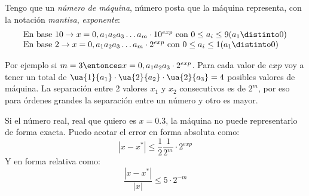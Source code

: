Tengo que un \textit{número de máquina}, número posta que la máquina representa, con la notación \textit{mantisa}, \textit{exponente}:
$$
  \begin{array}{l}
    \text{En base 10} \to x = 0,a_1a_2a_3 \ldots a_m \cdot 10^{exp}  \text{ con } 0 \leq a_i \leq 9 (a_1 \distinto 0) \\
    \text{En base 2} \to x = 0,a_1a_2a_3 \ldots a_m \cdot 2^{exp}  \text{ con } 0 \leq a_i \leq 1  (a_1 \distinto 0)
  \end{array}
$$

Por ejemplo si $m = 3 \entonces x = 0,a_1a_2a_3 \cdot 2^{exp}$.
Para cada valor de $exp$ voy a tener un total de $\ua{1}{a_1} \cdot \ua{2}{a_2} \cdot \ua{2}{a_3} = 4$ posibles valores de máquina.
La separación entre 2 valores $x_1$ y $x_2$ consecutivos es de $2^m$, por eso para órdenes grandes la separación entre un número y otro
es mayor.

Si el número real, real que quiero es $x = 0.3$, la máquina no puede representarlo de forma exacta. Puedo acotar el error en forma absoluta como:
$$
  |x - x^*| \leq \frac{1}{2} \frac{1}{2^m}\cdot 2^{exp}
$$
Y en forma relativa como:
$$
  \frac{|x - x^*|}{|x|} \leq 5 \cdot 2^{-m}
$$
